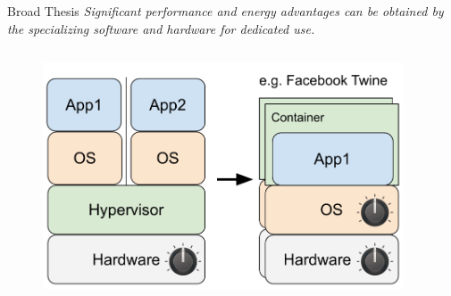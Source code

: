 \documentclass[notes=only,10pt,xcolor=table]{beamer}
\begin{document}
\begin{frame}{Broad Thesis}
 {
    \textit{Significant performance and energy advantages can be obtained by the specializing software and hardware for dedicated use.}
}
 {
\begin{columns}
    \begin{column}{.6\textwidth}
        \begin{figure}
            \includegraphics[width=1\textwidth]{img/Hypervisor_to_container.pdf}
        \end{figure}
    \end{column}
    \begin{column}{.4\textwidth}
        \begin{itemize}

\end{itemize}
\end{column}
\end{columns}}
\end{frame}
\end{document}
